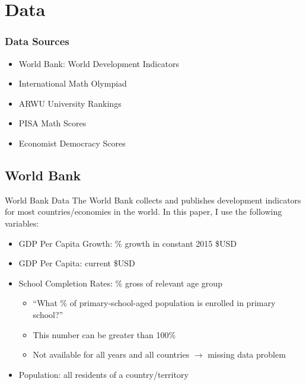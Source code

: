 \documentclass[10pt]{beamer}
\begin{document}
\section{Data}
\begin{frame}
\frametitle{Data Sources}
\begin{itemize}
    \item World Bank: World Development Indicators
    \item International Math Olympiad
    \item ARWU University Rankings
    \item PISA Math Scores
    \item Economist Democracy Scores
\end{itemize}
\end{frame}
\subsection{World Bank}
\begin{frame}{World Bank Data}
    The World Bank collects and publishes development indicators for most countries/economies in the world. In this paper, I use the following variables:

    \begin{itemize}
        \item GDP Per Capita Growth: \% growth in constant 2015 \$USD
        \item GDP Per Capita: current \$USD
        \item School Completion Rates: \% gross of relevant age group
        \begin{itemize}
            \item ``What \% of primary-school-aged population is enrolled in primary school?''
            \item This number can be greater than 100\%
            \item Not available for all years and all countries $\rightarrow$ missing data problem
        \end{itemize}
        \item Population: all residents of a country/territory
    \end{itemize}
\end{frame}

\end{document}

